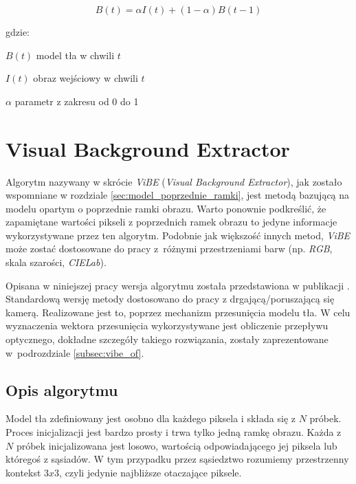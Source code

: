 	\begin{equation}
	B(t) = \alpha I(t) + (1 - \alpha)B(t-1) 
	\label{equ:adaptive_bg_sub}
	\end{equation}	
	
\noindent gdzie:
\begin{eqwhere}[2cm]
 \item[$B(t)$] model tła w chwili $t$
 \item[$I(t)$] obraz wejściowy w chwili $t$
 \item[$\alpha$] parametr z zakresu od 0 do 1\\
\end{eqwhere}


\section{Visual Background Extractor}
\label{sec:vibe_teoria}

Algorytm nazywany w skrócie \textit{ViBE} (\textit{Visual Background Extractor}), jak zostało wspomniane w rozdziale \ref{sec:model_poprzednie_ramki}, jest metodą bazującą na modelu opartym o poprzednie ramki obrazu. Warto ponownie podkreślić, że zapamiętane wartości pikseli z poprzednich ramek obrazu to jedyne informacje wykorzystywane przez ten algorytm. Podobnie jak większość innych metod, \textit{ViBE} może zostać dostosowane do pracy z~różnymi przestrzeniami barw (np. \textit{RGB}, skala szarości, \textit{CIELab}).

Opisana w niniejszej pracy wersja algorytmu została przedstawiona w publikacji \cite{kryjak_14_vibe}. Standardową wersję metody dostosowano do pracy z drgającą/poruszającą się kamerą. Realizowane jest to, poprzez mechanizm przesunięcia modelu tła. W celu wyznaczenia wektora przesunięcia wykorzystywane jest obliczenie przepływu optycznego, dokładne szczegóły takiego rozwiązania, zostały zaprezentowane w~podrozdziale \ref{subsec:vibe_of}.

\subsection{Opis algorytmu}
\label{subsec:vibe_opis}

Model tła zdefiniowany jest osobno dla każdego piksela i składa się z $N$ próbek. Proces inicjalizacji jest bardzo prosty i trwa tylko jedną ramkę obrazu. Każda z $N$ próbek inicjalizowana jest losowo, wartością odpowiadającego jej piksela lub któregoś z sąsiadów. W tym przypadku przez sąsiedztwo rozumiemy przestrzenny kontekst $3x3$, czyli jedynie najbliższe otaczające piksele. 

